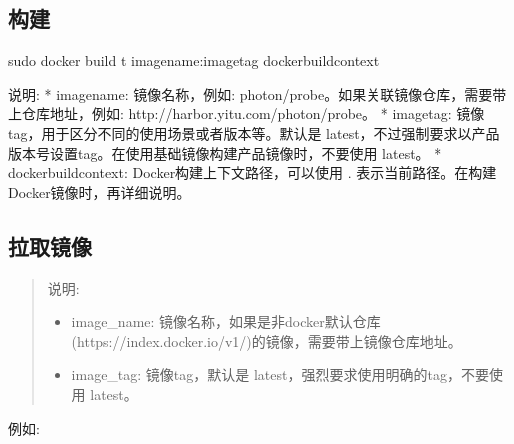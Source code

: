 \documentclass[letterpaper,10pt,english]{sphinxmanual}
\begin{document}
\subsection{构建}
\label{\detokenize{docker/basic_cmd:id3}}
\begin{sphinxVerbatim}[commandchars=\\\{\}]
sudo docker build \PYGZhy{}t \PYGZlt{}image\PYGZus{}name\PYGZgt{}:\PYGZlt{}image\PYGZus{}tag\PYGZgt{} \PYGZlt{}docker\PYGZus{}build\PYGZus{}context\PYGZgt{}

说明:
* image\PYGZus{}name: 镜像名称，例如: photon/probe。如果关联镜像仓库，需要带上仓库地址，例如: http://harbor.yitu.com/photon/probe。
* image\PYGZus{}tag: 镜像tag，用于区分不同的使用场景或者版本等。默认是 latest，不过强制要求以产品版本号设置tag。在使用基础镜像构建产品镜像时，不要使用 latest。
* docker\PYGZus{}build\PYGZus{}context: Docker构建上下文路径，可以使用 . 表示当前路径。在构建Docker镜像时，再详细说明。
\end{sphinxVerbatim}


\subsection{拉取镜像}
\label{\detokenize{docker/basic_cmd:id4}}
\begin{sphinxVerbatim}[commandchars=\\\{\}]
   
\end{sphinxVerbatim}
\begin{quote}

说明:
\begin{itemize}
\item {} 
image\_name: 镜像名称，如果是非docker默认仓库(https://index.docker.io/v1/)的镜像，需要带上镜像仓库地址。

\item {} 
image\_tag: 镜像tag，默认是 latest，强烈要求使用明确的tag，不要使用 latest。

\end{itemize}
\end{quote}

例如:

\begin{sphinxVerbatim}[commandchars=\\\{\}]
   
\end{sphinxVerbatim}
\end{document}
